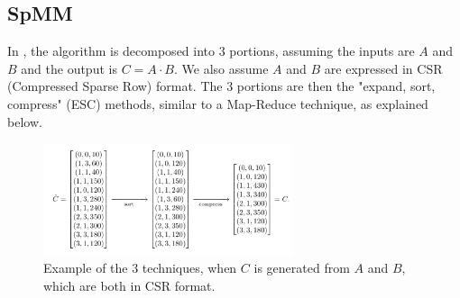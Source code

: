 \documentclass[12pt]{article}
\begin{document}
\subsection{SpMM}
\hspace{0.5cm}In \cite{bell_spmm}, the algorithm is decomposed into 3 portions, assuming the inputs are $A$ and $B$ and the output is $C = A \cdot B$. We also assume  $A$ and $B$ are expressed in CSR (Compressed Sparse Row) format. The 3 portions are then the "expand, sort, compress" (ESC) methods, similar to a Map-Reduce technique, as explained below. 

\begin{figure}[h]
  \caption{Example of the 3 techniques, when $C$ is generated from $A$ and $B$, which are both in CSR format. }
  \centering 
  \includegraphics[width = 0.65\textwidth]{expand_sort_compress.png}
\end{figure}
\end{document}
